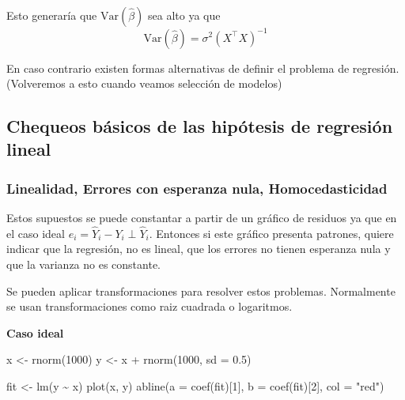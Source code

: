 \documentclass[
  12pt,
]{book}
\newenvironment{Shaded}{\begin{snugshade}}{\end{snugshade}}
\newcommand{\AttributeTok}[1]{\textcolor[rgb]{0.77,0.63,0.00}{#1}}
\newcommand{\DecValTok}[1]{\textcolor[rgb]{0.00,0.00,0.81}{#1}}
\newcommand{\FloatTok}[1]{\textcolor[rgb]{0.00,0.00,0.81}{#1}}
\newcommand{\FunctionTok}[1]{\textcolor[rgb]{0.00,0.00,0.00}{#1}}
\newcommand{\NormalTok}[1]{#1}
\newcommand{\OtherTok}[1]{\textcolor[rgb]{0.56,0.35,0.01}{#1}}
\newcommand{\SpecialCharTok}[1]{\textcolor[rgb]{0.00,0.00,0.00}{#1}}
\newcommand{\StringTok}[1]{\textcolor[rgb]{0.31,0.60,0.02}{#1}}
\providecommand{\tightlist}{%
  \setlength{\itemsep}{0pt}\setlength{\parskip}{0pt}}
\theoremstyle{definition}
\theoremstyle{definition}
\theoremstyle{definition}
\theoremstyle{definition}
\theoremstyle{remark}
\begin{document}
Esto generaría que \(\mathrm{Var}\left(\hat{\beta}\right)\) sea alto ya que
\begin{equation*}
\text{Var}(\hat{\beta}) =  \sigma^2(X^{\top}X)^{-1}
\end{equation*}

\begin{description}
\tightlist
\item[Más observaciones que predictores]
En caso contrario existen formas alternativas de definir el problema de regresión. (Volveremos a esto cuando veamos selección de modelos)
\end{description}

\hypertarget{chequeos-buxe1sicos-de-las-hipuxf3tesis-de-regresiuxf3n-lineal}{%
\subsection{Chequeos básicos de las hipótesis de regresión lineal}\label{chequeos-buxe1sicos-de-las-hipuxf3tesis-de-regresiuxf3n-lineal}}

\hypertarget{linealidad-errores-con-esperanza-nula-homocedasticidad}{%
\subsubsection{Linealidad, Errores con esperanza nula, Homocedasticidad}\label{linealidad-errores-con-esperanza-nula-homocedasticidad}}

Estos supuestos se puede constantar a partir de un gráfico de residuos ya que en el caso ideal \(e_{i} = \hat{Y}_{i}- Y_{i} \perp \hat{Y}_{i}\). Entonces si este gráfico presenta patrones, quiere indicar que la regresión, no es lineal, que los errores no tienen esperanza nula y que la varianza no es constante.

Se pueden aplicar transformaciones para resolver estos problemas. Normalmente se usan transformaciones como raiz cuadrada o logaritmos.

\textbf{Caso ideal}

\begin{Shaded}
\begin{Highlighting}[]
\NormalTok{x }\OtherTok{\textless{}{-}} \FunctionTok{rnorm}\NormalTok{(}\DecValTok{1000}\NormalTok{)}
\NormalTok{y }\OtherTok{\textless{}{-}}\NormalTok{ x }\SpecialCharTok{+} \FunctionTok{rnorm}\NormalTok{(}\DecValTok{1000}\NormalTok{, }\AttributeTok{sd =} \FloatTok{0.5}\NormalTok{)}

\NormalTok{fit }\OtherTok{\textless{}{-}} \FunctionTok{lm}\NormalTok{(y }\SpecialCharTok{\textasciitilde{}}\NormalTok{ x)}
\FunctionTok{plot}\NormalTok{(x, y)}
\FunctionTok{abline}\NormalTok{(}\AttributeTok{a =} \FunctionTok{coef}\NormalTok{(fit)[}\DecValTok{1}\NormalTok{], }\AttributeTok{b =} \FunctionTok{coef}\NormalTok{(fit)[}\DecValTok{2}\NormalTok{], }\AttributeTok{col =} \StringTok{"red"}\NormalTok{)}
\end{Highlighting}
\end{Shaded}
\end{document}
